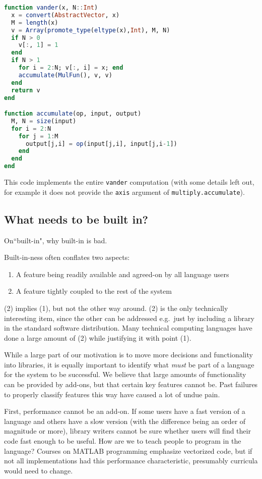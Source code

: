 {\begin{singlespace}
\begin{lstlisting}[language=julia]
function vander(x, N::Int)
  x = convert(AbstractVector, x)
  M = length(x)
  v = Array(promote_type(eltype(x),Int), M, N)
  if N > 0
    v[:, 1] = 1
  end
  if N > 1
    for i = 2:N; v[:, i] = x; end
    accumulate(MulFun(), v, v)
  end
  return v
end

function accumulate(op, input, output)
  M, N = size(input)
  for i = 2:N
    for j = 1:M
      output[j,i] = op(input[j,i], input[j,i-1])
    end
  end
end
\end{lstlisting}
\end{singlespace}

\noindent
This code implements the entire \texttt{vander} computation
(with some details left out, for example it does not provide the
\texttt{axis} argument of \texttt{multiply.accumulate}).


\subsection{What needs to be built in?}

On``built-in", why built-in is bad.

Built-in-ness often conflates two aspects:

\begin{enumerate}
\item A feature being readily available and agreed-on by all language users
\item A feature tightly coupled to the rest of the system
\end{enumerate}

(2) implies (1), but not the other way around. (2) is the only technically
interesting item, since the other can be addressed e.g.\  just by including
a library in the standard software distribution. Many technical computing
languages have done a large amount of (2) while justifying it with point (1).


While a large part of our motivation is to move more decisions and functionality
into libraries, it is equally important to identify what {\it  must} be part of a
language for the system to be successful. We believe that large amounts of
functionality can be provided by add-ons, but that certain key features
cannot be. Past failures to properly classify features this way have
caused a lot of undue pain.

First, performance cannot be an add-on. If some users have a fast version of
a language and others have a slow version (with the difference being an
order of magnitude or more), library writers cannot be sure whether users
will find their code fast enough to be useful. How are we to teach people to
program in the language? Courses on MATLAB programming emphasize vectorized code,
but if not all implementations had this performance characteristic,
presumably curricula would need to change.

}
